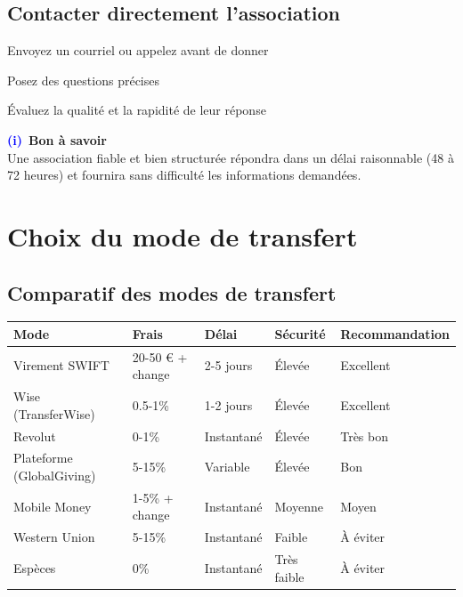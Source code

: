 \documentclass[12pt, a4paper]{article}
\newcommand{\info}{\textcolor{blue}{\textbf{(i)}}}
\begin{document}
\subsection{Contacter directement l'association}
\begin{arrowlist}
    \item Envoyez un courriel ou appelez avant de donner
    \item Posez des questions précises
    \item Évaluez la qualité et la rapidité de leur réponse
\end{arrowlist}

\begin{helpbox}
    \centering
    \info\ \textbf{Bon à savoir} \\
    Une association fiable et bien structurée répondra dans un délai raisonnable (48 \`a 72 heures) et fournira sans difficulté les informations demandées.
\end{helpbox}

\newpage

\section{Choix du mode de transfert}

\subsection{Comparatif des modes de transfert}

\begin{tcolorbox}[colback=lightgray, colframe=darkgray, title=Tableau comparatif]
    \small
    \renewcommand{\arraystretch}{1.5}
    \begin{tabular}{|p{3cm}|p{2cm}|p{2cm}|p{2.5cm}|p{2cm}|}
        \hline
        \textbf{Mode} & \textbf{Frais} & \textbf{Délai} & \textbf{Sécurité} & \textbf{Recommandation} \\
        \hline
        Virement SWIFT & 20-50 € + change & 2-5 jours & Élevée & Excellent \\
        \hline
        Wise (TransferWise) & 0.5-1\% & 1-2 jours & Élevée & Excellent \\
        \hline
        Revolut & 0-1\% & Instantané & Élevée & Très bon \\
        \hline
        Plateforme (GlobalGiving) & 5-15\% & Variable & Élevée & Bon \\
        \hline
        Mobile Money & 1-5\% + change & Instantané & Moyenne & Moyen \\
        \hline
        Western Union & 5-15\% & Instantané & Faible & À éviter \\
        \hline
        Espèces & 0\% & Instantané & Très faible & À éviter \\
        \hline
    \end{tabular}
\end{tcolorbox}
\end{document}
